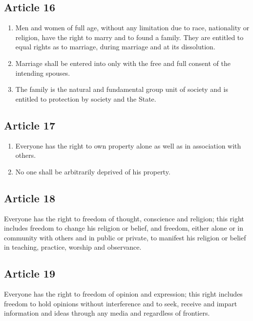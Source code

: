 \documentclass[
  ngerman,
  american,
  titlepage,
  openright,
  DIV=calc,
  toc=listof,
  listof=nochaptergap]{scrbook}
\begin{document}
\subsection{Article 16}\label{article-16-4}

\begin{enumerate}
\def\labelenumi{\arabic{enumi}.}
\item
  Men and women of full age, without any limitation due to race,
  nationality or religion, have the right to marry and to found a
  family. They are entitled to equal rights as to marriage, during
  marriage and at its dissolution.
\item
  Marriage shall be entered into only with the free and full consent of
  the intending spouses.
\item
  The family is the natural and fundamental group unit of society and is
  entitled to protection by society and the State.
\end{enumerate}

\subsection{Article 17}\label{article-17-4}

\begin{enumerate}
\def\labelenumi{\arabic{enumi}.}
\item
  Everyone has the right to own property alone as well as in association
  with others.
\item
  No one shall be arbitrarily deprived of his property.
\end{enumerate}

\subsection{Article 18}\label{article-18-4}

Everyone has the right to freedom of thought, conscience and religion;
this right includes freedom to change his religion or belief, and
freedom, either alone or in community with others and in public or
private, to manifest his religion or belief in teaching, practice,
worship and observance.

\subsection{Article 19}\label{article-19-4}

Everyone has the right to freedom of opinion and expression; this right
includes freedom to hold opinions without interference and to seek,
receive and impart information and ideas through any media and
regardless of frontiers.
\end{document}
